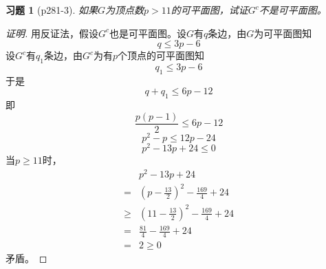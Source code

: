 \documentclass{article}
\begin{document}
\begin{CJK}{UTF8}{gbsn}
\newtheorem*{Exercise}{习题}
\begin{Exercise}[p281-3]
  如果$G$为顶点数$p>11$的可平面图，试证$G^c$不是可平面图。
\end{Exercise}
\begin{proof}[证明]  用反证法，假设$G^c$也是可平面图。设$G$有$q$条边，由$G$为可平面图知
  \[q \leq 3p - 6\]
  设$G^c$有$q_1$条边，由$G^c$为有$p$个顶点的可平面图知
  \[q_1 \leq 3p - 6\]
  于是
  \[q + q _1 \leq 6p-12\]
  即
  \[\frac{p(p-1)}{2} \leq 6p-12\]
  \[p^2-p \leq 12p-24\]
  \[p^2-13p+24 \leq 0\]
  当$p\geq 11$时，
  \begin{equation*}
    \begin{split}
     &p^2-13p+24\\
     =&(p-\frac{13}{2})^2-\frac{169}{4}+24\\
     \geq&(11-\frac{13}{2})^2-\frac{169}{4} + 24\\
     =&\frac{81}{4} - \frac{169}{4} + 24\\
     =&2 \geq 0
    \end{split}
  \end{equation*}
  矛盾。
\end{proof}

\end{CJK}
\end{document}
